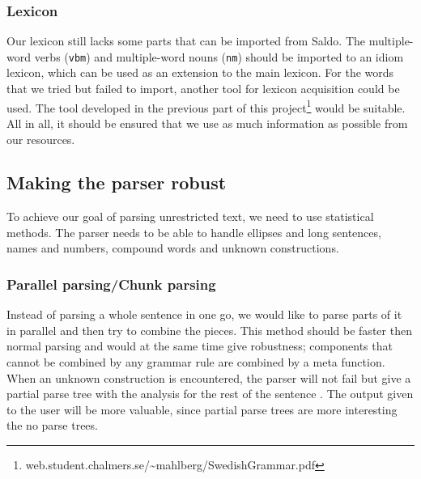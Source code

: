\documentclass{report}
\begin{document}
\subsubsection{Lexicon}
Our lexicon still lacks some parts that can be imported from Saldo.
The multiple-word verbs (\verb-vbm-) and multiple-word nouns (\verb-nm-) should
be imported to an idiom lexicon, which can be used as an extension to the main
lexicon.
For the words that we tried but failed to import, another tool for lexicon
acquisition could be used. The tool developed in the previous part of
this project\footnote{web.student.chalmers.se/\~{}mahlberg/SwedishGrammar.pdf} would be suitable.
All in all, it should be ensured that we use as much information as
possible from our resources.


\subsection{Making the parser robust}
To achieve our goal of parsing unrestricted text, we need to use statistical methods.
The parser needs to be able to handle
ellipses and long sentences, names and numbers,
compound words and unknown constructions.

\subsubsection{Parallel parsing/Chunk parsing}
Instead of parsing a whole sentence in one go, we would like to
parse parts of it in parallel and then try to combine the pieces.
This method should be faster then normal parsing and would
at the same time give robustness;
components that cannot be combined by any grammar rule are combined by a 
meta function. When an unknown construction is encountered, the parser
will not fail but give a partial parse tree with the analysis for the rest of
the sentence \cite{gfMech}.
The output given to the user will be more valuable, since partial parse
trees are more interesting the no parse trees.
\end{document}

